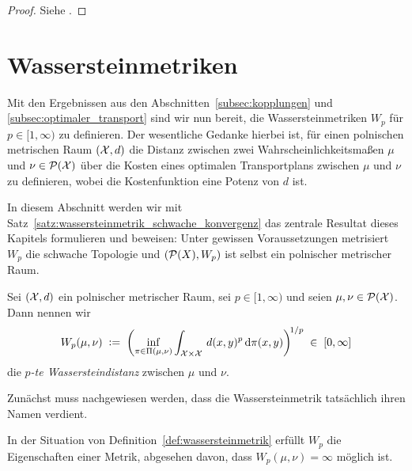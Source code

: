 \documentclass[../thesis/thesis.tex]{subfiles}
\begin{document}
	\begin{proof}
		Siehe \cite[Corollary 5.21]{Villani.2009}.
	\end{proof}

	\section{Wassersteinmetriken}
	\label{subsec:wassersteinmetriken}
	
	Mit den Ergebnissen aus den Abschnitten~\ref{subsec:kopplungen} und \ref{subsec:optimaler_transport} sind wir nun bereit, die Wassersteinmetriken $W_p$ für $p \in [1, \infty)$ zu definieren. Der wesentliche Gedanke hierbei ist,
	für einen polnischen metrischen Raum $(\mathcal{X}, d)$ die Distanz zwischen zwei Wahrscheinlichkeitsmaßen $\mu$ und $\nu \in \mathcal{P}(\mathcal{X})$ über die Kosten eines optimalen Transportplans zwischen $\mu$ und
	$\nu$ zu definieren, wobei die Kostenfunktion eine Potenz von $d$ ist.
	
	In diesem Abschnitt werden wir mit Satz~\ref{satz:wassersteinmetrik_schwache_konvergenz} das zentrale Resultat dieses Kapitels formulieren und beweisen: Unter gewissen Voraussetzungen metrisiert $W_p$ die schwache Topologie und $(\mathcal{P}(X), W_p)$ ist selbst ein polnischer metrischer Raum.

	\begin{Definition}
		\label{def:wassersteinmetrik}
		Sei $(\mathcal{X}, d)$ ein polnischer metrischer Raum, sei $p \in [1, \infty)$ und seien $\mu, \nu \in \mathcal{P}(\mathcal{X})$. Dann nennen wir
		$$ W_p(\mu, \nu) \; \vcentcolon = \; \left(\inf_{\pi \in \Pi(\mu, \nu)} \int_{\mathcal{X} \times \mathcal{X}} \, d(x, y)^p \, \mathrm{d}\pi(x, y)\right)^{\! 1/p} \; \in \; [0, \infty] $$
		die \emph{$p$-te Wassersteindistanz} zwischen $\mu$ und $\nu$.
	\end{Definition}

	Zunächst muss nachgewiesen werden, dass die Wassersteinmetrik tatsächlich ihren Namen verdient.

	\begin{Satz}
		\label{satz:wassersteinmetrik_ist_metrik}
		In der Situation von Definition~\ref{def:wassersteinmetrik} erfüllt $W_p$ die Eigenschaften einer Metrik, abgesehen davon, dass $W_p(\mu, \nu) = \infty$ möglich ist.
	\end{Satz}
\end{document}
